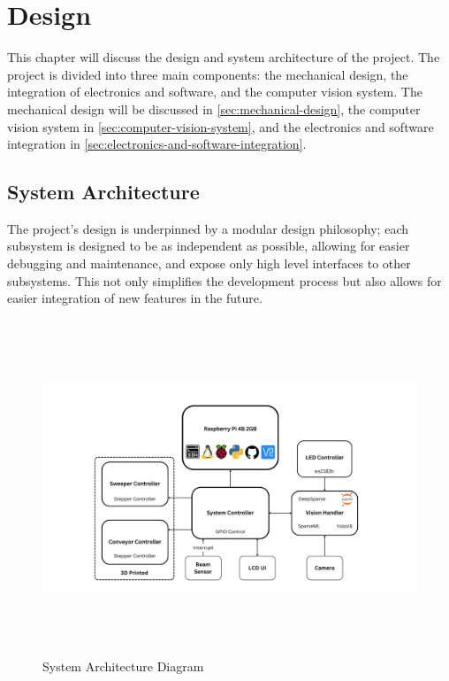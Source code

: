 \section{Design}
\label{sec:design-and-system-architecture}

This chapter will discuss the design and system architecture of the project. The project is divided into three main components: the mechanical design, the integration of electronics and software, and the computer vision system. The mechanical design will be discussed in \autoref{sec:mechanical-design}, the computer vision system in \autoref{sec:computer-vision-system}, and the electronics and software integration in \autoref{sec:electronics-and-software-integration}.

\subsection{System Architecture}
\label{sec:system-architecture}

The project's design is underpinned by a modular design philosophy; each subsystem is designed to be as independent as possible, allowing for easier debugging and maintenance, and expose only high level interfaces to other subsystems. This not only simplifies the development process but also allows for easier integration of new features in the future.

\begin{figure}[H]
    \begin{minipage}[h]{\textwidth}
        \centering
        \includegraphics[height=10cm]{imgs/diagrams/System Diagram.png}
        \caption{System Architecture Diagram}
    \end{minipage}
\end{figure}

